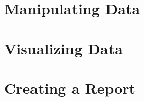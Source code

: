 \documentclass[]{book}
\begin{document}
\hypertarget{manipulating-data}{%
\chapter{Manipulating Data}\label{manipulating-data}}

\hypertarget{visualizing-data}{%
\chapter{Visualizing Data}\label{visualizing-data}}

\hypertarget{creating-a-report}{%
\chapter{Creating a Report}\label{creating-a-report}}


\end{document}

